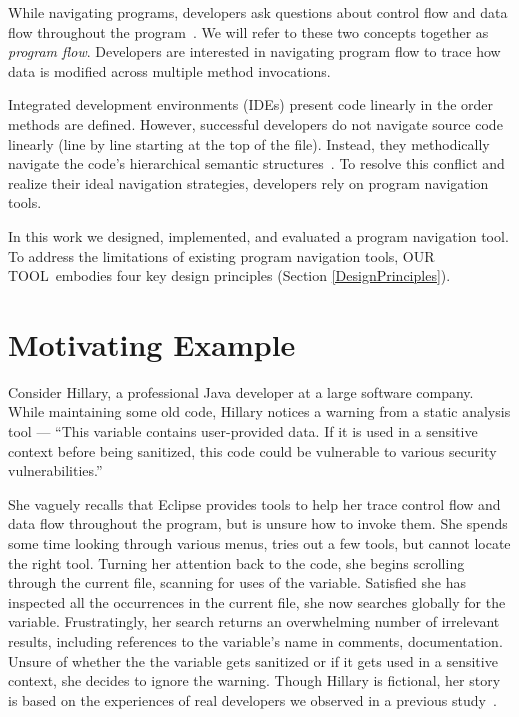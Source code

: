 \documentclass[conference]{IEEEtran}
\newcommand{\toolName}{OUR TOOL}
\begin{document}
While navigating programs, developers ask questions about control flow and data flow throughout the program~\cite{latoza2010hard, Smith2015}. We will refer to these two concepts together as \textit{program flow}. Developers are interested in navigating program flow to trace how data is modified across multiple method invocations.

Integrated development environments (IDEs) present code linearly in the order methods are defined. However, successful developers do not navigate source code linearly (line by line starting at the top of the file). Instead, they methodically navigate the code's hierarchical semantic structures~\cite{robillard2004investigate}. To resolve this conflict and realize their ideal navigation strategies, developers rely on program navigation tools. 


In this work we designed, implemented, and evaluated a program navigation tool.
To address the limitations of existing program navigation tools, \toolName~embodies four key design principles (Section \ref{DesignPrinciples}).

\section{Motivating Example}
Consider Hillary, a professional Java developer at a large software company.
While maintaining some old code, Hillary notices a warning from a static analysis tool --- ``This variable contains user-provided data. If it is used in a sensitive context before being sanitized, this code could be vulnerable to various security vulnerabilities.''

She vaguely recalls that Eclipse provides tools to help her trace control flow and data flow throughout the program, but is unsure how to invoke them.
She spends some time looking through various menus, tries out a few tools, but cannot locate the right tool.
Turning her attention back to the code, she begins scrolling through the current file, scanning for uses of the variable. 
Satisfied she has inspected all the occurrences in the current file, she now searches globally for the variable.
Frustratingly, her search returns an overwhelming number of irrelevant results, including references to the variable's name in comments, documentation.
Unsure of whether the the variable gets sanitized or if it gets used in a sensitive context, she decides to ignore the warning.
Though Hillary is fictional, her story is based on the experiences of real developers we observed in a previous study~\cite{Smith2015}.
\end{document}
